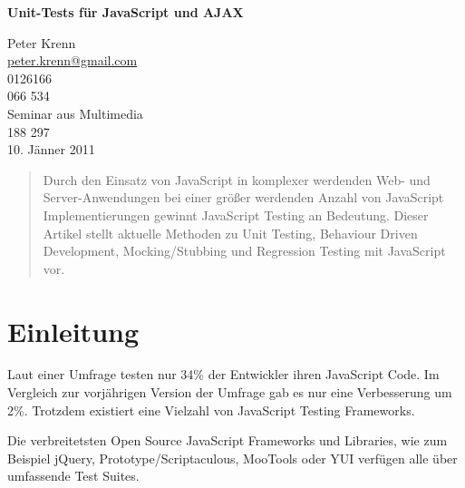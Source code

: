 \documentclass[11pt, a4paper]{article}
\begin{document}
\begin{titlepage}

\begin{center}
  \textsf{\textbf{\Huge Unit-Tests für JavaScript und AJAX}}\\[15cm]
\end{center}

\begin{flushright}
  \textsf{\Large Peter Krenn}\\
  \textsf{\href{mailto:peter.krenn@gmail.com}{peter.krenn@gmail.com}}\\
  \textsf{0126166}\\
  \textsf{066 534}\\[1cm]
  \textsf{Seminar aus Multimedia}\\
  \textsf{188 297}\\[1cm]
  \textsf{10. Jänner 2011}
\end{flushright}

\end{titlepage}

\begin{abstract}
  Durch den Einsatz von JavaScript in komplexer werdenden Web- und
  Server-Anwendungen bei einer größer werdenden Anzahl von JavaScript
  Implementierungen gewinnt JavaScript Testing an Bedeutung. Dieser Artikel stellt
  aktuelle Methoden zu Unit Testing, Behaviour Driven Development,
  Mocking/Stubbing und Regression Testing mit JavaScript vor.
\end{abstract}

\addvspace{5cm}

\tableofcontents

\clearpage

\section{Einleitung}

Laut einer Umfrage\cite{young_dailyjs_2010} testen nur 34\% der Entwickler ihren
JavaScript Code. Im Vergleich zur vorjährigen Version der
Umfrage\cite{young_dailyjs_2009} gab es nur eine Verbesserung um 2\%. Trotzdem
existiert eine Vielzahl von JavaScript Testing Frameworks.

Die verbreitetsten Open Source JavaScript Frameworks und Libraries, wie zum
Beispiel jQuery\cite{resig_jquery_2011},
Prototype/Scriptaculous\cite{prototype_js_prototype_2011},
MooTools\cite{mootools_mootools_2011} oder YUI\cite{yahoo_inc._yui_2011-1}
verfügen alle über umfassende Test Suites.
\end{document}
